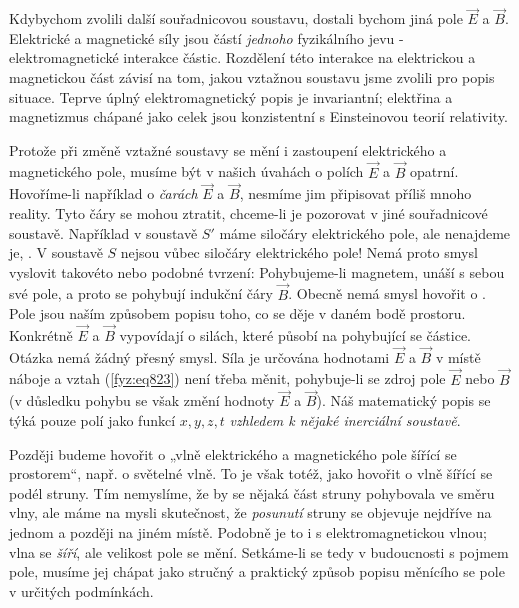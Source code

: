     Kdybychom zvolili další souřadnicovou soustavu, dostali bychom jiná pole \(\vec{E}\) a
    \(\vec{B}\). Elektrické a magnetické síly jsou částí \emph{jednoho} fyzikálního jevu -
    elektromagnetické interakce částic. Rozdělení této interakce na elektrickou a magnetickou část
    závisí na tom, jakou vztažnou soustavu jsme zvolili pro popis situace. Teprve úplný
    elektromagnetický popis je invariantní; elektřina a magnetizmus chápané jako celek jsou
    konzistentní s Einsteinovou teorií relativity.

    Protože při změně vztažné soustavy se mění i zastoupení elektrického a magnetického pole, musíme
    být v našich úvahách o polích \(\vec{E}\) a \(\vec{B}\) opatrní. Hovoříme-li například o
    \emph{čarách} \(\vec{E}\) a \(\vec{B}\), nesmíme jim připisovat příliš mnoho reality. Tyto čáry
    se mohou ztratit, chceme-li je pozorovat v jiné souřadnicové soustavě. Například v soustavě
    \(S'\) máme siločáry elektrického pole, ale nenajdeme je, . V soustavě \(S\) nejsou vůbec siločáry elektrického pole! Nemá proto smysl
    vyslovit takovéto nebo podobné tvrzení: Pohybujeme-li magnetem, unáší s sebou své pole, a proto
    se pohybují indukční čáry \(\vec{B}\). Obecně nemá smysl hovořit o . Pole jsou naším způsobem popisu toho, co se děje v daném bodě prostoru. Konkrétně
    \(\vec{E}\) a \(\vec{B}\) vypovídají o silách, které působí na pohybující se částice. Otázka
     nemá
    žádný přesný smysl.  Síla je určována hodnotami \(\vec{E}\) a \(\vec{B}\) v místě náboje a vztah
    (\ref{fyz:eq823}) není třeba měnit, pohybuje-li se zdroj pole \(\vec{E}\) nebo \(\vec{B}\) (v
    důsledku pohybu se však změní hodnoty \(\vec{E}\) a \(\vec{B}\)). Náš matematický popis se týká
    pouze polí jako funkcí \(x, y, z, t\) \emph{vzhledem k nějaké inerciální soustavě}.

    Později budeme hovořit o „vlně elektrického a magnetického pole šířící se prostorem“, např. o
    světelné vlně. To je však totéž, jako hovořit o vlně šířící se podél struny. Tím nemyslíme, že
    by se nějaká část struny pohybovala ve směru vlny, ale máme na mysli skutečnost, že
    \emph{posunutí} struny se objevuje nejdříve na jednom a později na jiném místě. Podobně je to i
    s elektromagnetickou vlnou; vlna se \emph{šíří}, ale velikost pole se mění. Setkáme-li se tedy v
    budoucnosti s pojmem  pole, musíme jej chápat jako stručný a praktický
    způsob popisu měnícího se pole v určitých podmínkách.
    
